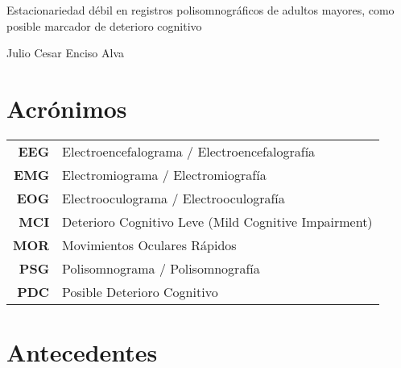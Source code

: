 \documentclass[12pt,a4paper]{mitthesis}
\begin{document}

\begin{center}
\huge{Estacionariedad d\'ebil en registros polisomnogr\'aficos de adultos mayores,
como posible marcador de deterioro cognitivo}


\Large{Julio Cesar Enciso Alva}
\end{center}

\newpage




\chapter*{Acr\'onimos}

\begin{tabular}{rl}
\textbf{EEG} & Electroencefalograma / Electroencefalograf\'ia
\\
\textbf{EMG} & Electromiograma / Electromiograf\'ia
\\
\textbf{EOG} & Electrooculograma / Electrooculograf\'ia
\\
\textbf{MCI} & Deterioro Cognitivo Leve (Mild Cognitive Impairment)
\\
\textbf{MOR} & Movimientos Oculares R\'apidos
\\
\textbf{PSG} & Polisomnograma / Polisomnograf\'ia
\\
\textbf{PDC} & Posible Deterioro Cognitivo
\end{tabular}


\tableofcontents
\newpage


%


\chapter{Antecedentes}


\end{document}

